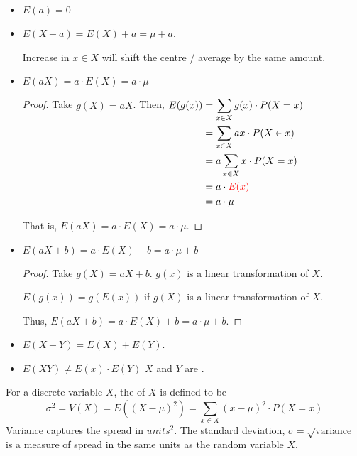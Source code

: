 \begin{itemize}
    \item $E(a) = 0$

    \item $E(X + a) = E(X) + a = \mu + a$. 

    Increase in $x \in X$ will shift the centre / average by the same amount. 

    \item $E(aX) = a \cdot E(X) = a \cdot \mu$
    
    \begin{proof}
        Take $g(X) = aX$. Then, $\begin{aligned}[t]
            E(g(x)) & = \sum_{x \in X} g(x) \cdot P(X = x) \\
                    & = \sum_{x \in X} ax \cdot P(X \in x) \\
                    & = a \sum_{x \in X} x \cdot P(X = x)  \\
                    & = a \cdot \color{red} E(x)           \\
                    & = a \cdot \mu
        \end{aligned}$
        
        That is, $E(aX) = a \cdot E(X) = a \cdot \mu$. 
    \end{proof}

    \item $E(aX + b) = a \cdot E(X) + b = a \cdot \mu + b$

    \begin{proof}
        Take $g(X) = aX + b$. $g(x)$ is a linear transformation of $X$. 

        $E(g(x)) = g(E(x))$ if $g(X)$ is a linear transformation of $X$. 
        
        Thus, $E(aX + b) = a \cdot E(X) + b = a \cdot \mu + b$. 
    \end{proof}

    \item $E(X + Y) = E(X) + E(Y)$. 

    \item $E(XY) \neq E(x) \cdot E(Y)$  $X$ and $Y$ are . 
\end{itemize}

\begin{definition}[Variance]
    For a discrete variable $X$, the  of $X$ is defined to be $$\sigma^2 = V(X) = E((X - \mu)^2) = \sum_{x \in X} (x - \mu)^2 \cdot P(X = x)$$ 
    Variance captures the spread in $units^2$. The standard deviation, $\sigma = \sqrt{\text{variance}}$ is a measure of spread in the same units as the random variable $X$. 
\end{definition}

